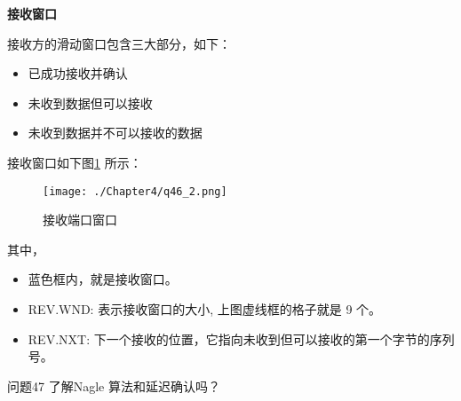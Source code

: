 \documentclass[cn,11pt,color=blue,lang=cn]{elegantbook}
\begin{document}
\begin{solution}
\begin{note} \textbf{接收窗口} \end{note}

接收方的滑动窗口包含三大部分，如下：
\begin{itemize}
	\item 已成功接收并确认
	\item 未收到数据但可以接收
	\item 未收到数据并不可以接收的数据
\end{itemize}

接收窗口如下图\ref{fig46_2} 所示：
\begin{figure}[htbp]
\centering
\texttt{[image: ./Chapter4/q46\_2.png]}
\caption{接收端口窗口}
\label{fig46_2}
\end{figure}

其中，
\begin{itemize}
	\item 蓝色框内，就是接收窗口。
	\item REV.WND: 表示接收窗口的大小, 上图虚线框的格子就是 9 个。
	\item REV.NXT: 下一个接收的位置，它指向未收到但可以接收的第一个字节的序列号。
\end{itemize}

\end{solution}


\begin{custom}{问题47}
了解Nagle 算法和延迟确认吗？
\end{custom}
\end{document}
